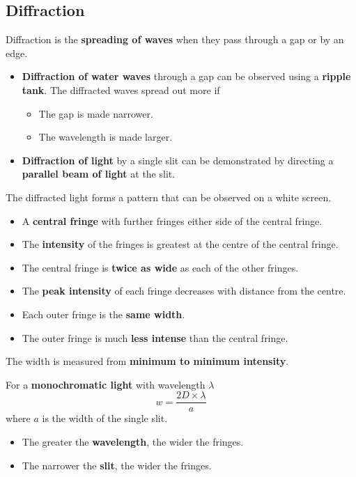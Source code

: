 \subsection{Diffraction}

Diffraction is the \textbf{spreading of waves} when they pass through a gap or by an edge.

\begin{itemize}
    \item \textbf{Diffraction of water waves} through a gap can be observed using a \textbf{ripple tank}. The diffracted waves spread out more if
        \begin{itemize}
            \item The gap is made narrower.
            \item The wavelength is made larger.
        \end{itemize}
    \item \textbf{Diffraction of light} by a single slit can be demonstrated by directing a \textbf{parallel beam of light} at the slit.
\end{itemize}

The diffracted light forms a pattern that can be observed on a white screen.
\begin{itemize}
    \item A \textbf{central fringe} with further fringes either side of the central fringe.
    \item The \textbf{intensity} of the fringes is greatest at the centre of the central fringe.
    \item The central fringe is \textbf{twice as wide} as each of the other fringes.
    \item The \textbf{peak intensity} of each fringe decreases with distance from the centre.
    \item Each outer fringe is the \textbf{same width}.
    \item The outer fringe is much \textbf{less intense} than the central fringe.
\end{itemize}

The width is measured from \textbf{minimum to minimum intensity}.

For a \textbf{monochromatic light} with wavelength $\lambda$
$$w=\frac{2D\times\lambda}{a}$$
where $a$ is the width of the single slit.
\begin{itemize}
    \item The greater the \textbf{wavelength}, the wider the fringes.
    \item The narrower the \textbf{slit}, the wider the fringes.
\end{itemize}
